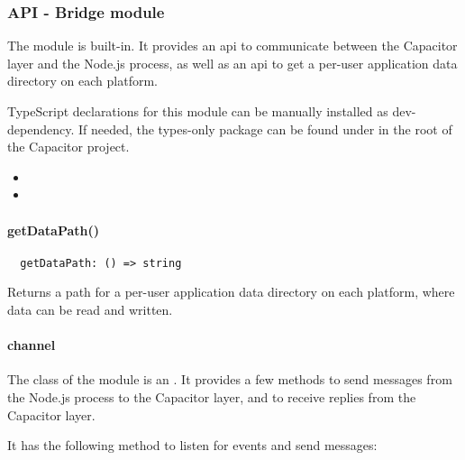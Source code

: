
\subsubsection{API - Bridge module}
\label{sec:Capacitor-NodeJS:API_BridgeModule}

The  module is built-in.
It provides an \ac{api} to communicate between the Capacitor layer and the Node.js process, as well as an \ac{api} to get a per-user application data directory on each platform.

TypeScript declarations for this  module can be manually installed as dev-dependency.
If needed, the types-only package can be found under  in the root of the Capacitor project.


\begin{itemize}
  \setlength\itemsep{-0.8em}
  \item {}
  \item {}
\end{itemize}


\paragraph{getDataPath()}

\begin{verbatim}
  getDataPath: () => string
\end{verbatim}

Returns a path for a per-user application data directory on each platform, where data can be read and written.


\paragraph{channel}

The  class of the  module is an .
It provides a few methods to send messages from the Node.js process to the Capacitor layer, and to receive replies from the Capacitor layer.

It has the following method to listen for events and send messages:

